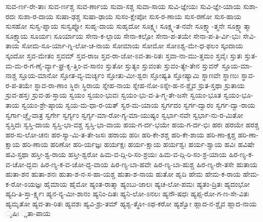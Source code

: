 {ಸುವ-ರ್ಣ-ರೇ-ತಾಃ
ಸುವ-ರ್ಣಶ್ಚ
ಸುವ-ರ್ಣಾಯ
ಸುವಾ-ಸಶ್ಚ
ಸುವಾ-ಸಾಯ
ಸುವಿ-ಜ್ಞೇಯಃ
ಸುವಿ-ಜ್ಞೇ-ಯಾಯ
ಸುಶಾ-ರದಃ
ಸುಶಾ-ರ-ದಾಯ
ಸುಷಾ-ಢಶ್ಚ
ಸುಷಾ-ಢಾಯ
ಸುಸಂ-ಕ್ಷೇಪೋ
ಸುಸ-ರ-ಣಾಯ
ಸುಸ-ರಣೋ
ಸುಸ-ಹಾಯ
ಸುಸಹೋ
ಸುಸ್ವ-ಪ್ನಾಯ
ಸುಸ್ವಪ್ನೋ
ಸುಹೃ-ದಾಯ
ಸುಹೃದೋ
ಸೂಕ್ಷ್ಮಃ
ಸೂಕ್ಷ್ಮ-ತ-ನವೇ
ಸೂಕ್ಷ್ಮಾ-ತ್ಮನೇ
ಸೂಕ್ಷ್ಮಾತ್ಮಾ
ಸೂಕ್ಷ್ಮಾಯ
ಸೂರ್ಯಃ
ಸೂರ್ಯಾಯ
ಸೇನಾ-ಕ-ಲ್ಪಾಯ
ಸೇನಾ-ಕಲ್ಪೋ
ಸೇನಾ-ಪ-ತಯೇ
ಸೇನಾ-ಪ-ತಿ-ರ್ವಿ-ಭುಃ
ಸೇವಿ-ತಾಯ
ಸೋಮ-ಸೂ-ರ್ಯಾ-ಗ್ನಿ-ಲೋ-ಚ-ನಾಯ
ಸೋಮಾಯ
ಸೋಮೋ
ಸೋಽಶ್ವ-ಮೇ-ಧ-ಫಲಂ
ಸ್ಕಂದಾಯ
ಸ್ಕಂದೋ
ಸ್ತವ-ಮೇತಂ
ಸ್ತವಮ್
ಸ್ತವ-ರಾಜ
ಸ್ತವ-ರಾ-ಜೋ-ಽವ-ತಾ-ರಿತಃ
ಸ್ತವಾ-ನಾ-ಮು-ತ್ತಮಂ
ಸ್ತವೈಃ
ಸ್ತುತಃ
ಸ್ತುತ-ಮ-ಮ-ರ-ಗ-ಣೈ-ರ್ವ್ಯಾ-ಘ್ರ-ಕೃ-ತ್ತಿಂ-ವ-ಸಾನಂ
ಸ್ತುತೋ
ಸ್ತುತ್ಯಂ
ಸ್ತುವಂತಃ
ಸ್ತುವಂ-ತ್ಯೇ-ತೇನ
ಸ್ತುವನ್
ಸ್ತೂಯ-ಮಾ-ನಾಶ್ಚ
ಸ್ತೂಯ-ಮಾನೋ
ಸ್ತೋತ-ವ್ಯ-ಮರ್ಚ್ಯಂ
ಸ್ತೋತು-ಮೀ-ಶ್ವರಃ
ಸ್ತೋಷ್ಯತಿ
ಸ್ತೋಷ್ಯಾಮಿ
ಸ್ಥಾಣವೇ
ಸ್ಥಾಣುಃ
ಸ್ಥಾವ-ರ-ಪ-ತಯೇ
ಸ್ಥಾವ-ರಾ-ಣಾಂ
ಸ್ಥಿರಃ
ಸ್ಥಿರಾಯ
ಸ್ನೇಹ-ನಾಯ
ಸ್ನೇಹ-ನೋ-ಽಸ್ನೇ-ಹ-ನ-ಶ್ಚೈವ
ಸ್ರುತ-ಸ್ತಥಾ
ಸ್ರುತಾಯ
ಸ್ರುವ-ಹಸ್ತಃ
ಸ್ರುವ-ಹ-ಸ್ತಾಯ
ಸ್ವಯಂ
ಸ್ವಯಂ-ಭುವಃ
ಸ್ವಯಂ-ಭು-ವ-ತಿ-ಗ್ಮ-ತೇ-ಜಸೇ
ಸ್ವಯಂ-ಭೂತ
ಸ್ವಯಂ-ಭೂ-ತಾಯ
ಸ್ವಯಂ-ಶ್ರೇ-ಷ್ಠಾಯ
ಸ್ವಯ-ಮ-ಧಾ-ರ-ಯತ್
ಸ್ವರ-ಮ-ಯಾಯ
ಸ್ವರ್ಗದಂ
ಸ್ವರ್ಗ-ದ್ವಾರಂ
ಸ್ವರ್ಗ-ದ್ವಾ-ರಾಯ
ಸ್ವರ್ಗಾ-ಚ್ಚೈ-ವಾತ್ರ
ಸ್ವರ್ಗೇ
ಸ್ವರ್ಗ್ಯಂ
ಸ್ವರ್ಗ್ಯ-ಮಾ-ರೋ-ಗ್ಯ-ಮಾ-ಯುಷ್ಯಂ
ಸ್ವರ್ಭಾ-ನವೇ
ಸ್ವರ್ಭಾ-ನು-ರ-ಮಿತೋ
ಸ್ವಸ್ತಿದಃ
ಸ್ವಸ್ತಿ-ದಾಯ
ಸ್ವಸ್ತಿ-ಭಾ-ವಶ್ಚ
ಸ್ವಸ್ತಿ-ಭಾ-ವಾಯ
ಹಯ-ಗ-ರ್ದ-ಭಯೇ
ಹಯ-ಗ-ರ್ದ-ಭಿಃ
ಹರಃ
ಹರಯೇ
ಹರಶ್ಚ
ಹರ-ಸು-ಲೋ-ಚನಃ
ಹರ-ಸ್ಯಾ-ಮಿ-ತ-ತೇ-ಜಸಃ
ಹರಾಯ
ಹರಿಃ
ಹರಿ-ಕೇ-ಶಶ್ಚ
ಹರಿ-ಕೇ-ಶಾಯ
ಹರಿ-ಣಾ-ಕ್ಷಶ್ಚ
ಹರಿ-ಣಾ-ಕ್ಷಾಯ
ಹರಿ-ಣಾಯ
ಹರಿಣೋ
ಹರಿ-ರ್ಯಜ್ಞಃ
ಹರ್ಯಕ್ಷಃ
ಹರ್ಯ-ಕ್ಷಾಯ
ಹರ್ಯಶ್ವಃ
ಹರ್ಯ-ಶ್ವಾಯ
ಹವಿಃ
ಹವಿಷೇ
ಹವಿ-ಸ್ತಥಾ
ಹಸ್ತೀ-ಶ್ವ-ರಾಯ
ಹಸ್ತೀ-ಶ್ವರೋ
ಹಿಮ-ವ-ದ್ಗಿ-ರಿ-ಸಂ-ಶ್ರಯಃ
ಹಿಮ-ವ-ದ್ಗಿ-ರಿ-ಸಂ-ಶ್ರ-ಯಾಯ
ಹಿರ-ಣ್ಯ-ಕ-ವ-ಚೋ-ದ್ಭವಃ
ಹಿರ-ಣ್ಯ-ಕ-ವ-ಚೋ-ದ್ಭ-ವಾಯ
ಹಿರ-ಣ್ಯ-ಬಾ-ಹವೇ
ಹಿರ-ಣ್ಯ-ಬಾ-ಹುಶ್ಚ
ಹಿರ-ಣ್ಯ-ರೇ-ತಸೇ
ಹುತಾಯ
ಹುತಾ-ಶನ
ಹುತಾ-ಶನಃ
ಹುತಾ-ಶ-ನ-ಸ-ಹಾ-ಯಶ್ಚ
ಹುತಾ-ಶ-ನಾಯ
ಹುತೋ
ಹೃದಿ
ಹೇಮ
ಹೇಮ-ಕ-ರಾಯ
ಹೇಮ-ಕ-ರೋ-ಽಯಜ್ಞಃ
ಹೈಮಾಯ
ಹೈಮೋ
ಹ್ಯಂತ-ರಾತ್ಮಾ
ಹ್ಯಂಬು-ಜಾಲಃ
ಹ್ಯಚ-ಲೋ-ಪಮಃ
ಹ್ಯತಂ-ದ್ರಿತಃ
ಹ್ಯದಂಭೋ
ಹ್ಯದಿ-ತಿ-ಸ್ತಾ-ರ್ಕ್ಷ್ಯಃ
ಹ್ಯನ-ನ್ಯ-ಮೀ-ಶಾನಂ
ಹ್ಯನಿಂ-ದಿತಃ
ಹ್ಯನಿ-ಲೋ-ಽನಲಃ
ಹ್ಯನೌ-ಷಧಃ
ಹ್ಯಪ್ಸ-ರೋ-ಗ-ಣ-ಸೇ-ವಿತಃ
ಹ್ಯಮೃತೋ
ಹ್ಯವ-ತಾ-ರಿತಃ
ಹ್ಯವಶಃ
ಹ್ಯವಿ-ಶ್ರು-ತಮ್
ಹ್ಯಶ್ವ-ತ್ಥೋ-ಽಥ-ಕರೋ
ಹ್ಯಶ್ವೋ
ಹ್ಲಾದ-ನ-ಶ್ಚೈವ
ಹ್ಲಾದ-ನಾಯ
ೃಷಿಃ
್ಣತಾ-ಪಾಯ
}
